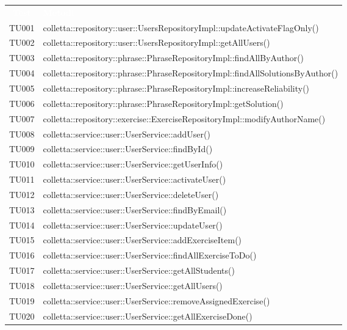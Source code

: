 \begin{tabularx}{\textwidth}{cX}
	
	\rowcolor{greySWEight}
	
	\rowcolor{greySWEight}
	\textcolor{white}{\textbf{Test}} & 
	\textcolor{white}{\textbf{Metodi}} \\
	
	TU001 & colletta::repository::user::UsersRepositoryImpl::updateActivateFlagOnly() \\
	TU002 & colletta::repository::user::UsersRepositoryImpl::getAllUsers() \\
	TU003 & colletta::repository::phrase::PhraseRepositoryImpl::findAllByAuthor() \\
	TU004 & colletta::repository::phrase::PhraseRepositoryImpl::findAllSolutionsByAuthor() \\
	TU005 & colletta::repository::phrase::PhraseRepositoryImpl::increaseReliability() \\
	TU006 & colletta::repository::phrase::PhraseRepositoryImpl::getSolution() \\
	TU007 & colletta::repository::exercise::ExerciseRepositoryImpl::modifyAuthorName() \\
	TU008 & colletta::service::user::UserService::addUser() \\
	TU009 & colletta::service::user::UserService::findById() \\
	TU010 & colletta::service::user::UserService::getUserInfo() \\
	TU011 & colletta::service::user::UserService::activateUser() \\
	TU012 & colletta::service::user::UserService::deleteUser() \\
	TU013 & colletta::service::user::UserService::findByEmail() \\
	TU014 & colletta::service::user::UserService::updateUser() \\
	TU015 & colletta::service::user::UserService::addExerciseItem() \\
	TU016 & colletta::service::user::UserService::findAllExerciseToDo() \\
	TU017 & colletta::service::user::UserService::getAllStudents() \\
	TU018 & colletta::service::user::UserService::getAllUsers() \\
	TU019 & colletta::service::user::UserService::removeAssignedExercise() \\
	TU020 & colletta::service::user::UserService::getAllExerciseDone() \\

\end{tabularx}
